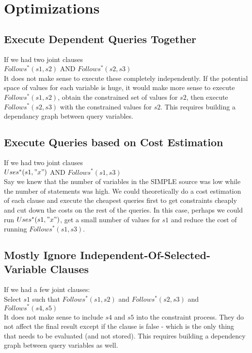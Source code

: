 \documentclass{article}
\begin{document}
\section{Optimizations}

\subsection{Execute Dependent Queries Together}
If we had two joint clauses \\

$Follows^*(s1, s2)$ AND $Follows^*(s2, s3)$ \\

It does not make sense to execute these completely independently. If the potential space of values for each variable is huge, it would make more sense to execute $Follows^*(s1, s2)$, obtain the constrained set of values for $s2$, then execute $Follows^*(s2, s3)$ with the constrained values for $s2$. This requires building a dependancy graph between query variables. 

\subsection{Execute Queries based on Cost Estimation}
If we had two joint clauses \\

$Uses^*(s1, "x")$ AND $Follows^*(s1, s3)$ \\

Say we knew that the number of variables in the SIMPLE source was low while the number of statements was high. We could theoretically do a cost estimation of each clause and execute the cheapest queries first to get constraints cheaply and cut down the costs on the rest of the queries. In this case, perhaps we could run $Uses^*(s1, "x")$, get a small number of values for $s1$ and reduce the cost of running $Follows^*(s1, s3)$.

\subsection{Mostly Ignore Independent-Of-Selected-Variable Clauses}

If we had a few joint clauses: \\

Select $s1$ such that $Follows^*(s1, s2)$ and $Follows^*(s2, s3)$ and $Follows^*(s4, s5)$\\

It does not make sense to include $s4$ and $s5$ into the constraint process. They do not affect the final result except if the clause is false - which is the only thing that needs to be evaluated (and not stored). This requires building a dependency graph between query variables as well. 
\end{document}
